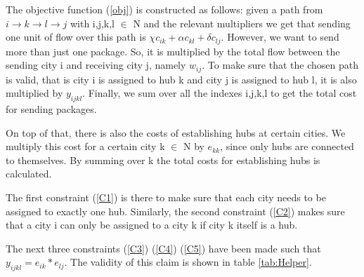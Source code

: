 \documentclass{article}
\begin{document}
The objective function (\ref{obj}) is constructed as follows: given a path from $i \rightarrow k \rightarrow l \rightarrow j$ with i,j,k,l $\in$ N and the relevant multipliers we get that sending one unit of flow over this path is $\chi c_{ik} + \alpha c_{kl} + \delta c_{lj}$. However, we want to send more than just one package. So, it is multiplied by the total flow between the sending city i and receiving city j, namely $w_{ij}$. To make sure that the chosen path is valid, that is city i is assigned to hub k and city j is assigned to hub l, it is also multiplied by $y_{ijkl}$. Finally, we sum over all the indexes i,j,k,l to get the total cost for sending packages.

On top of that, there is also the costs of establishing hubs at certain cities. We multiply this cost for a certain city k $\in$ N by $e_{kk}$, since only hubs are connected to themselves. By summing over k the total costs for establishing hubs is calculated.

The first constraint (\ref{C1}) is there to make sure that each city needs to be assigned to exactly one hub. Similarly, the second constraint (\ref{C2}) makes sure that a city i can only be assigned to a city k if city k itself is a hub.

The next three constraints (\ref{C3}) (\ref{C4}) (\ref{C5}) have been made such that $y_{ijkl} = e_{ik}*e_{lj}$. The validity of this claim is shown in table \ref{tab:Helper}.
\end{document}
